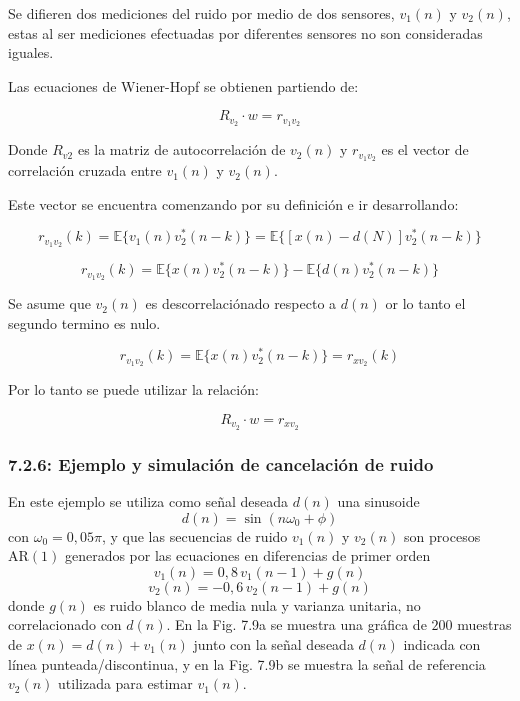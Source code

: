 \documentclass[a4paper]{article}
\begin{document}
 
 Se difieren dos mediciones del ruido por medio de dos sensores, $v_1(n)$ y $v_2(n)$, estas al ser mediciones efectuadas por diferentes sensores no son consideradas iguales.
 
 Las ecuaciones de Wiener-Hopf se obtienen partiendo de:
 
 \begin{equation}
 	R_{v_2} \cdot w = r_{v_1 v_2}
 \end{equation} 
 
 
 Donde $R_{v2}$ es la matriz de autocorrelación de $v_2(n)$ y $r_{v_1 v_2}$ es el vector de correlación cruzada entre  $v_1(n)$ y $v_2(n)$.
 
 Este vector se encuentra comenzando por su definición e ir desarrollando:
 
 \begin{equation}
 	r_{v_1 v_2} (k) = \mathbb{E} \{ v_1(n)v_2^{\ast} (n-k) \} =  \mathbb{E}\{ [x(n) - d(N)]v_2^{\ast} (n-k) \}
 \end{equation}

\begin{equation}
	r_{v_1 v_2} (k) =  \mathbb{E} \{ x(n) v_2^{\ast} (n-k) \} -  \mathbb{E}\{ d(n)v_2^{\ast} (n-k) \}
\end{equation}
 
 
Se asume que $v_2(n)$ es descorrelaciónado respecto a $d(n)$ or lo tanto el segundo termino es nulo.

\begin{equation}
	r_{v_1 v_2} (k) =  \mathbb{E} \{ x(n) v_2^{\ast} (n-k) \}  = r_{x v_2}(k)
\end{equation}

 
Por lo tanto se puede utilizar la relación:

 \begin{equation}
	R_{v_2} \cdot w = r_{x v_2}
\end{equation} 


\subsubsection*{7.2.6: Ejemplo y simulación de cancelación de ruido}


En este ejemplo se utiliza como señal deseada $d(n)$ una sinusoide $$d(n) = \sin(n\omega_0 + \phi)$$ con $\omega_0 = 0{,}05\pi$, y que las secuencias de ruido $v_1(n)$ y $v_2(n)$ son procesos $\mathrm{AR}(1)$ generados por las ecuaciones en diferencias de primer orden $$v_1(n) = 0{,}8\,v_1(n-1) + g(n)$$ $$v_2(n) = -0{,}6\,v_2(n-1) + g(n)$$ donde $g(n)$ es ruido blanco de media nula y varianza unitaria, no correlacionado con $d(n)$. En la Fig. 7.9a se muestra una gráfica de $200$ muestras de $x(n) = d(n) + v_1(n)$ junto con la señal deseada $d(n)$ indicada con línea punteada/discontinua, y en la Fig. 7.9b se muestra la señal de referencia $v_2(n)$ utilizada para estimar $v_1(n)$. 
\end{document}
